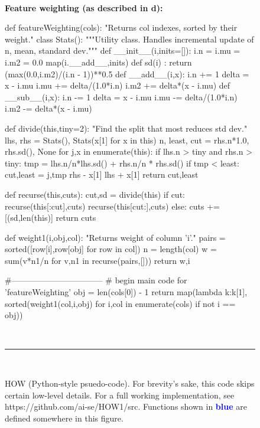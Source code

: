\begin{figure*}
\begin{minipage}{.45\linewidth}
~~

{\bf Feature weighting  (as described in d):}

\begin{python}[right]
def featureWeighting(cols):
  "Returns col indexes, sorted by their weight."
  class Stats():  
    """Utility class. Handles incremental update of
       n, mean, standard dev."""
    def __init__(i,inits=[]):
      i.n = i.mu = i.m2 = 0.0
      map(i.__add__,inits)
    def sd(i) :  return (max(0.0,i.m2)/(i.n - 1))**0.5
    def __add__(i,x):
      i.n  += 1
      delta = x - i.mu
      i.mu += delta/(1.0*i.n)
      i.m2 += delta*(x - i.mu) 
    def __sub__(i,x):
      i.n  -= 1
      delta = x - i.mu
      i.mu -= delta/(1.0*i.n)
      i.m2 -= delta*(x - i.mu) 
      
  def divide(this,tiny=2):
    "Find the split that most reduces std dev."
    lhs, rhs = Stats(), Stats(x[1] for x in this)
    n, least, cut = rhs.n*1.0, rhs.sd(), None
    for j,x in enumerate(this):
      if lhs.n > tiny and rhs.n > tiny:
        tmp = lhs.n/n*lhs.sd() + rhs.n/n * rhs.sd()
        if tmp < least:
           cut,least = j,tmp
      rhs - x[1]
      lhs + x[1]
    return cut,least
    
  def recurse(this,cuts):
    cut,sd = divide(this)
    if cut:
      recurse(this[:cut],cuts)
      recurse(this[cut:],cuts)
    else:
      cuts += [(sd,len(this)]
    return cuts  
    
  def weight1(i,obj,col):
    "Returns weight of column 'i'."
    pairs = sorted([row[i],row[obj] for row in col])
    n     = length(col)
    w     = sum(v*n1/n for v,n1 in recurse(pairs,[]))
    return w,i
    
  #---------------------------------
  # begin main code for  'featureWeighting'
  obj = len(cols[0]) - 1 
  return map(lambda k:k[1],
             sorted(weight1(col,i,obj) 
                    for i,col in enumerate(cols)
                    if not i == obj))
\end{python}
\end{minipage}
~\hrule~
\caption{HOW (Python-style psuedo-code).
For brevity's sake, this code skips certain low-level details.
For a full working implementation, see https://github.com/ai-se/HOW1/src.
Functions shown in \textcolor{blue}{{\bf blue}} are defined somewhere in this figure.}\label{fig:howcode}   
\end{figure*}
